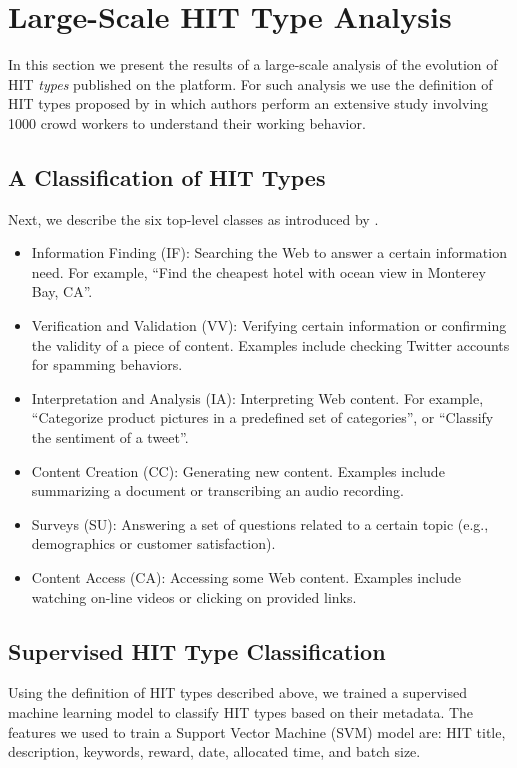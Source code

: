 \section{Large-Scale HIT Type Analysis}\label{sec:type}
In this section we present the results of a large-scale analysis of the evolution of HIT \emph{types} published on the \amt{} platform.
For such analysis we use the definition of HIT types proposed by \cite{Gadiraju:2014:TMW:2631775.2631819} in which authors perform an extensive study involving 1000 crowd workers to understand their working behavior. 

\subsection{A Classification of HIT Types}
Next, we describe the six top-level classes as introduced by \cite{Gadiraju:2014:TMW:2631775.2631819}.

\begin{itemize}

	\item Information Finding (IF): Searching the Web to answer a certain information need. For example, ``Find the cheapest hotel with ocean view in Monterey Bay, CA''.
	
	\item Verification and Validation (VV): Verifying certain information or confirming the validity of a piece of content. Examples include checking Twitter accounts for spamming behaviors.

	\item Interpretation and Analysis (IA): Interpreting Web content. For example, ``Categorize product pictures in a predefined set of categories'', or ``Classify the sentiment of a tweet''.
	
	\item Content Creation (CC): Generating new content. Examples include summarizing a document  or transcribing an audio recording.

	\item Surveys (SU): Answering a set of questions related to a certain topic (e.g., demographics or customer satisfaction). 
	
	\item Content Access (CA): Accessing some Web content. Examples include watching on-line videos or clicking on provided links.

\end{itemize}

\subsection{Supervised HIT Type Classification}
Using the definition of HIT types described above, we trained a supervised machine learning model to classify HIT types based on their metadata. The features we used to train a Support Vector Machine (SVM) model are: HIT title, description, keywords, reward, date, allocated time, and batch size.

